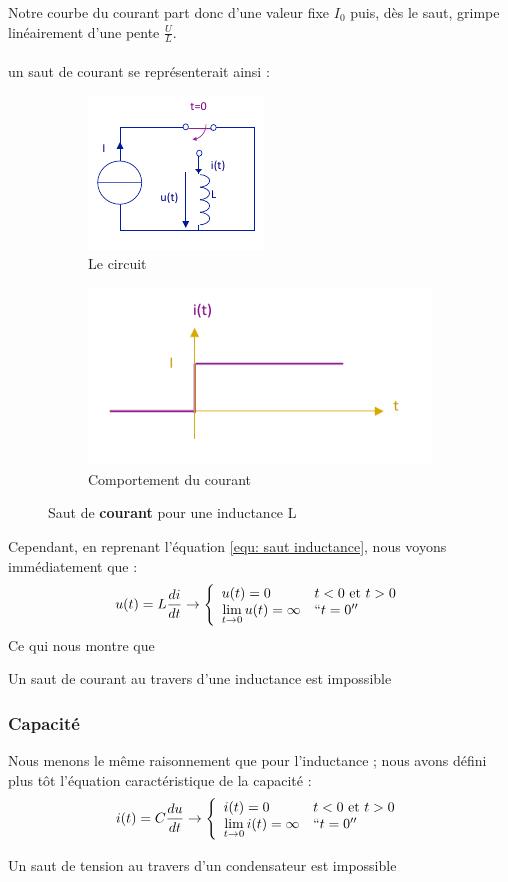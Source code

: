 \documentclass[12pt,a4paper]{article}
\begin{document}
Notre courbe du courant part donc d'une valeur fixe $I_0$ puis, dès le saut, grimpe linéairement d'une pente $\frac{U}{L}$.\\
\\
 un saut de courant se représenterait ainsi :
\begin{figure}[!h]
	\centering
	\begin{subfigure}[b]{0.45\textwidth}
		\centering
		\includegraphics[scale=0.75]{images/saut_courant_L}
		\caption{Le circuit}
	\end{subfigure}
	\begin{subfigure}[b]{0.45\textwidth}
		\centering
		\includegraphics[scale=0.65]{images/fonctions_saut_courant_L}
		\caption{Comportement du courant}
	\end{subfigure}
	\caption{Saut de \textbf{courant} pour une inductance L}
\end{figure}

Cependant, en reprenant l'équation \ref{equ: saut inductance}, nous voyons immédiatement que :
\[u(t) = L\frac{di}{dt} \to \left\{\begin{array}{ll}
u(t) = 0 & t< 0 \mbox{ et } t > 0\\
\lim\limits_{t \to 0} u(t) = \infty & ``t = 0''
\end{array}\right.\]
Ce qui nous montre que 
\begin{boite}
Un saut de courant au travers d'une inductance est impossible		
\end{boite}

\subsubsection{Capacité}
 Nous menons le même raisonnement que pour l'inductance ; nous avons défini plus tôt l'équation caractéristique de la capacité :
\[i(t) = C\frac{du}{dt} \to \left\{\begin{array}{ll}
	i(t) = 0 & t<0 \mbox{ et } t>0\\
	\lim\limits_{t\to 0} i(t) = \infty & ``t=0''
\end{array}\right.\]
\begin{boite}
	Un saut de tension au travers d'un condensateur est impossible
\end{boite}
\end{document}
